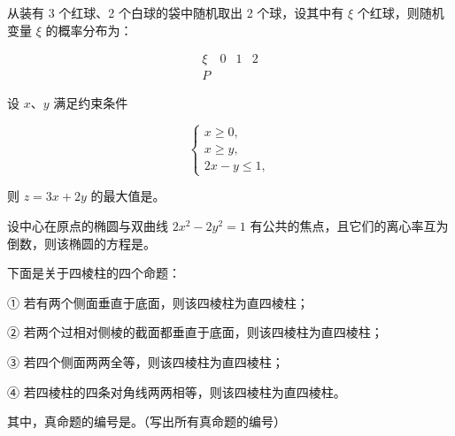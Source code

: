 \begin{question}
从装有 3 个红球、2 个白球的袋中随机取出 2 个球，设其中有 $\xi$ 个红球，则随机变量 $\xi$ 的概率分布为：

\nopagebreak[4]
\[
\begin{array}{c|ccc}
\xi&0&1&2\\
\hline
P&&&
\end{array}
\]

\end{question}
\begin{question}
设 $x\text{、}y$ 满足约束条件

\nopagebreak[4]
\[
\begin{cases}
x\geqslant0,\\
x\geqslant y,\\
2x-y\leqslant1,
\end{cases}
\]

则 $z=3x+2y$ 的最大值是\gkblank{}。

\end{question}
\begin{question}
设中心在原点的椭圆与双曲线 $2x^2-2y^2=1$ 有公共的焦点，且它们的离心率互为倒数，则该椭圆的方程是\gkblank{}。

\end{question}
\begin{question}
下面是关于四棱柱的四个命题：

① 若有两个侧面垂直于底面，则该四棱柱为直四棱柱；

② 若两个过相对侧棱的截面都垂直于底面，则该四棱柱为直四棱柱；

③ 若四个侧面两两全等，则该四棱柱为直四棱柱；

④ 若四棱柱的四条对角线两两相等，则该四棱柱为直四棱柱。

其中，真命题的编号是\gkblank{}。（写出所有真命题的编号）

\end{question}

